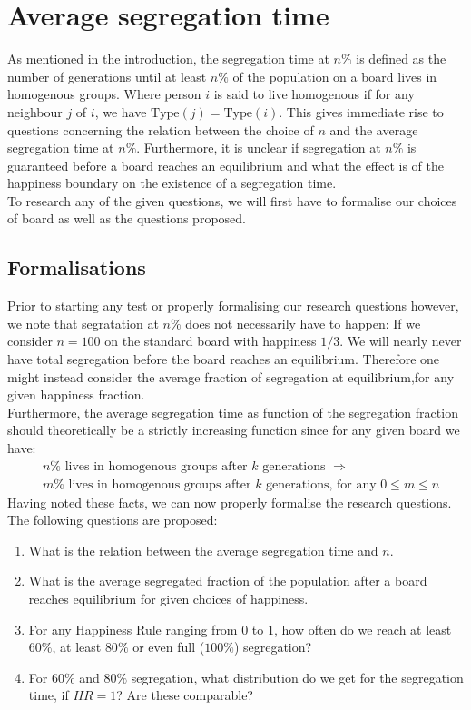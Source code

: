 
\section{Average segregation time}\label{sec:aveseg}
As mentioned in the introduction, the segregation time at \(n\%\) is defined as the number of generations until at least \(n\%\) of the population on a board lives in homogenous groups. 
Where person \(i\) is said to live homogenous if for any neighbour \(j\) of \(i\), we have \(\text{Type}(j)=\text{Type}(i)\).
This gives immediate rise to questions concerning the relation between the choice of \(n\) and the average segregation time at \(n\%\). 
Furthermore, it is unclear if segregation at \(n\%\) is guaranteed before a board reaches an equilibrium and what the effect is of the happiness boundary on the existence of a segregation time.\\

To research any of the given questions, we will first have to formalise our choices of board as well as the questions proposed.\\


\subsection{Formalisations}
Prior to starting any test or properly formalising our research questions however, we note that segratation at \(n\%\) does not necessarily have to happen: 
If we consider \(n=100\) on the standard board with happiness \(1/3\). We will nearly never have total segregation before the board reaches an equilibrium.
Therefore one might instead consider the average fraction of segregation at equilibrium,for any given happiness fraction. \\

Furthermore, the average segregation time as function of the segregation fraction should theoretically be a strictly increasing function since for any given board we have:
\begin{align*}
&n\% \text{ lives in homogenous groups after } k \text{ generations } \Rightarrow\\
& m\% \text{ lives in homogenous groups after } k \text{ generations, for any } 0 \leq m \leq n
\end{align*} 
Having noted these facts, we can now properly formalise the research questions.\\
The following questions are proposed:
\begin{enumerate}
 \item What is the relation between the average segregation time and \(n\).
 \item What is the average segregated fraction of the population after a board reaches equilibrium for given choices of happiness.
 \item For any Happiness Rule ranging from 0 to 1, how often do we reach at least $60\%$, at least $80\%$ or even full ($100\%$) segregation?
 \item For $60\%$ and $80\%$ segregation, what distribution do we get for the segregation time, if $HR = 1$? Are these comparable?
\end{enumerate}

